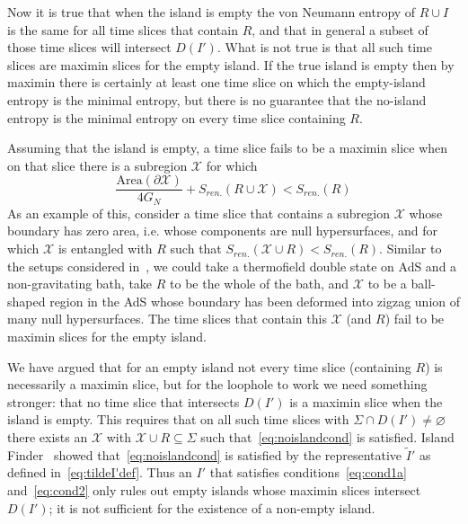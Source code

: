 \documentclass[a4paper,11pt]{article}
\newcommand{\cts}[1]{\ignorespaces}
\def\bne{\begin{equation}}
\def\ene{\end{equation}}
\newcommand{\del}{\partial}
\begin{document}
Now it is true that when the island is empty the von Neumann entropy of $R \cup I$ is the same for all time slices that contain $R$, and that in general a subset of those time slices will intersect $D(I')$. What is not true is that all such time slices
are maximin slices for the empty island. If the true island is empty then by maximin there is certainly at least one time slice on which the empty-island entropy is the minimal entropy, but there is no guarantee that the no-island entropy is the minimal entropy on every time slice containing $R$.

Assuming that the island is empty, a time slice fails to be a maximin slice when on that slice there is a subregion $\mathcal{X}$  for which 
\bne \label{eq:noislandcond} \frac{\text{Area}(\del \mathcal{X})}{4G_N} + S_{ren.}(R \cup \mathcal{X})< S_{ren.} (R)\ene
As an example of this, consider a time slice that contains a subregion $\mathcal{X}$ whose boundary has zero area, i.e. whose components are null hypersurfaces, and for which $\mathcal{X}$ is entangled with $R$ such that $S_{ren.}(\mathcal{X} \cup R) < S_{ren.} (R)$. Similar to the setups considered in~\cite{Hartman2020}, we could take a thermofield double state on AdS and a non-gravitating bath, take $R$ to be the whole of the bath, and $\mathcal{X}$ to be a ball-shaped region in the AdS whose boundary has been deformed into zigzag union of many null hypersurfaces. The time slices that contain this $\mathcal{X}$ (and $R$) fail to be maximin slices for the empty island.
\cts{Think carefully about when/whether $S_{ren.}(AB) < S_{ren.}(A)$.}

We have argued that for an empty island not every time slice (containing $R$) is necessarily a maximin slice, but for the loophole to work we need something stronger: that no time slice that intersects $D(I')$ is a maximin slice when the island is empty. This requires that on all such time slices with $\Sigma \cap D(I') \neq \varnothing$ there exists an $\mathcal X$ with $\mathcal X \cup R \subseteq \Sigma$ 
such that~\eqref{eq:noislandcond} is satisfied.
Island Finder~\cite{Bousso2021} showed that~\eqref{eq:noislandcond} is satisfied by the representative $\tilde{I}'$ as defined in~\eqref{eq:tildeI'def}. Thus an $I'$ that satisfies conditions~\eqref{eq:cond1a} and~\eqref{eq:cond2} only rules out empty islands whose maximin slices intersect $D(I')$; it is not sufficient for the existence of a non-empty island.
\end{document}
